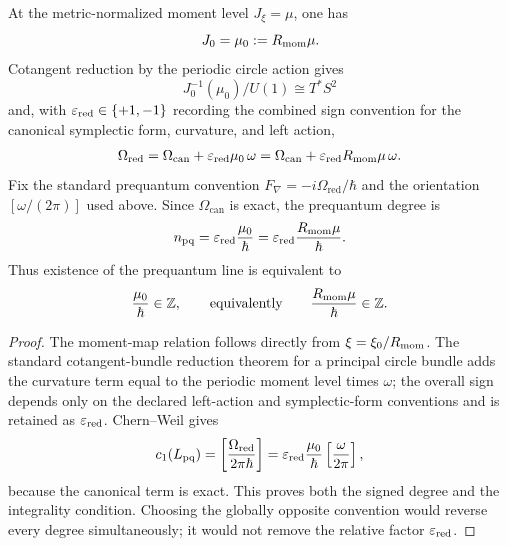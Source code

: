 \documentclass[12pt,a4paper]{article}
\begin{document}
\begin{proposition}
\label{p2e:prop:normalized-cotangent-reduction}
At the metric-normalized moment level \(J_\xi=\mu\), one has
\[
        J_0=\mu_0:=R_{\mathrm{mom}}\mu.
\]
Cotangent reduction by the periodic circle action gives
\[
        J_0^{-1}(\mu_0)/U(1)\cong T^*S^2
\]
and, with \(\varepsilon_{\rm red}\in\{+1,-1\}\) recording the combined sign
convention for the canonical symplectic form, curvature, and left action,
\[
        \Omega_{\mathrm{red}}
        =\Omega_{\mathrm{can}}+\varepsilon_{\rm red}\mu_0\,\omega
        =\Omega_{\mathrm{can}}+\varepsilon_{\rm red}R_{\mathrm{mom}}\mu\,\omega.
\]
Fix the standard prequantum convention
\(F_{\nabla}=-i\Omega_{\mathrm{red}}/\hbar\) and the orientation
\([\omega/(2\pi)]\) used above.  Since \(\Omega_{\mathrm{can}}\) is exact,
the prequantum degree is
\[
        n_{\rm pq}
        =\varepsilon_{\rm red}\frac{\mu_0}{\hbar}
        =\varepsilon_{\rm red}\frac{R_{\mathrm{mom}}\mu}{\hbar}.
\]
Thus existence of the prequantum line is equivalent to
\[
        \frac{\mu_0}{\hbar}\in\mathbb Z,
        \qquad\text{equivalently}\qquad
        \frac{R_{\mathrm{mom}}\mu}{\hbar}\in\mathbb Z.
\]
\end{proposition}

\begin{proof}
The moment-map relation follows directly from
\(\xi=\xi_0/R_{\mathrm{mom}}\).  The standard cotangent-bundle reduction theorem for a
principal circle bundle adds the curvature term equal to the periodic
moment level times \(\omega\); the overall sign depends only on the declared
left-action and symplectic-form conventions and is retained as
\(\varepsilon_{\rm red}\).  Chern--Weil gives
\[
 c_1(L_{\rm pq})
 =\left[\frac{\Omega_{\rm red}}{2\pi\hbar}\right]
 =\varepsilon_{\rm red}\frac{\mu_0}{\hbar}
   \left[\frac{\omega}{2\pi}\right],
\]
because the canonical term is exact.  This proves both the signed degree and
the integrality condition.  Choosing the globally opposite convention would
reverse every degree simultaneously; it would not remove the relative factor
\(\varepsilon_{\rm red}\).
\end{proof}
\end{document}
